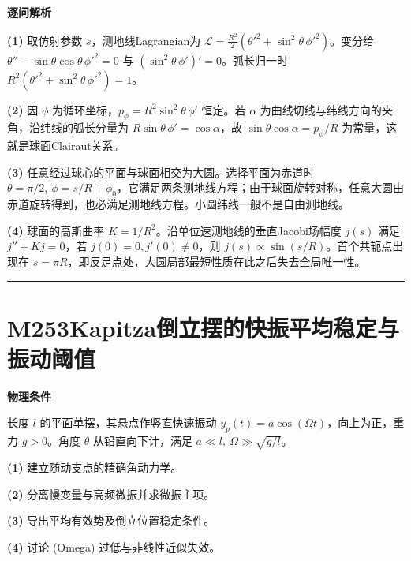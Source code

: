 \documentclass[UTF8,a4paper,11pt,oneside,openany]{ctexbook}
\begin{document}
\par\medskip\noindent\textbf{逐问解析}
\par\noindent\textbf{(1)} 取仿射参数 \(s\)，测地线Lagrangian为 \(\mathcal L=\tfrac{R^2}{2}(\theta'^2+\sin^2\theta\,\phi'^2)\)。变分给 \(\theta''-\sin\theta\cos\theta\,\phi'^2=0\) 与 \((\sin^2\theta\,\phi')'=0\)。弧长归一时 \(R^2(\theta'^2+\sin^2\theta\,\phi'^2)=1\)。
\par\noindent\textbf{(2)} 因 \(\phi\) 为循环坐标，\(p_\phi=R^2\sin^2\theta\,\phi'\) 恒定。若 \(\alpha\) 为曲线切线与纬线方向的夹角，沿纬线的弧长分量为 \(R\sin\theta\,\phi'=\cos\alpha\)，故 \(\sin\theta\cos\alpha=p_\phi/R\) 为常量，这就是球面Clairaut关系。
\par\noindent\textbf{(3)} 任意经过球心的平面与球面相交为大圆。选择平面为赤道时 \(\theta=\pi/2,\ \phi=s/R+\phi_0\)，它满足两条测地线方程；由于球面旋转对称，任意大圆由赤道旋转得到，也必满足测地线方程。小圆纬线一般不是自由测地线。
\par\noindent\textbf{(4)} 球面的高斯曲率 \(K=1/R^2\)。沿单位速测地线的垂直Jacobi场幅度 \(j(s)\) 满足 \(j''+Kj=0\)，若 \(j(0)=0,j'(0)\ne0\)，则 \(j(s)\propto\sin(s/R)\)。首个共轭点出现在 \(s=\pi R\)，即反足点处，大圆局部最短性质在此之后失去全局唯一性。

\par\bigskip\hrule\bigskip
\section*{M253\quad Kapitza倒立摆的快振平均稳定与振动阈值}
\textbf{物理条件}\par 长度 \(l\) 的平面单摆，其悬点作竖直快速振动 \(y_p(t)=a\cos(\Omega t)\)，向上为正，重力 \(g>0\)。角度 \(\theta\) 从铅直向下计，满足 \(a\ll l,\ \Omega\gg\sqrt{g/l}\)。
\par\noindent\textbf{(1)} 建立随动支点的精确角动力学。
\par\noindent\textbf{(2)} 分离慢变量与高频微振并求微振主项。
\par\noindent\textbf{(3)} 导出平均有效势及倒立位置稳定条件。
\par\noindent\textbf{(4)} 讨论 (Omega) 过低与非线性近似失效。
\end{document}
